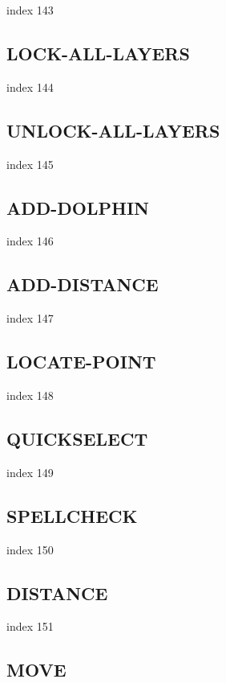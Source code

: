 \documentclass[11pt]{report}
\begin{document}
index 143

\subsection{LOCK-ALL-LAYERS}

index 144

\subsection{UNLOCK-ALL-LAYERS}

index 145

\subsection{ADD-DOLPHIN}

index 146

\subsection{ADD-DISTANCE}

index 147

\subsection{LOCATE-POINT}

index 148

\subsection{QUICKSELECT}

index 149

\subsection{SPELLCHECK}

index 150

\subsection{DISTANCE}

index 151

\subsection{MOVE}
\end{document}
